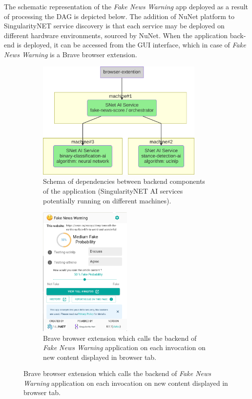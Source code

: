 \documentclass[]{report}
\begin{document}
The schematic representation of the \textit{Fake News Warning} app deployed as a
result of processing the DAG is depicted below. The addition of NuNet platform
to SingularityNET service discovery is that each service may be deployed on
different hardware environments, sourced by NuNet. When the application back-end
is deployed, it can be accessed from the GUI interface, which in case of
\textit{Fake News Warning} is a Brave browser extension.

\begin{figure}[H]
  \begin{subfigure}[t]{0.50\textwidth}
    \centering
    \includegraphics[width=0.9\textwidth]{../../../ontology/images/fake_news_detector.png}
    \captionsetup{width=0.8\linewidth}
    \caption{Schema of dependencies between backend components of the application
    (SingularityNET AI services potentially running on different machines).}
    \label{fig:fake_news_detector_schema}
  \end{subfigure}
  \begin{subfigure}[t]{0.50\textwidth}
    \centering
    \includegraphics[width=0.5\textwidth]{../../../ontology/images/fake_news_detector_browser_extension.png}
    \captionsetup{width=0.8\linewidth}
    \caption{Brave browser extension which calls the backend of
    \textit{Fake News Warning} application on each invocation on new
    content displayed in browser tab.}
  \end{subfigure}
\end{figure}
\end{document}
